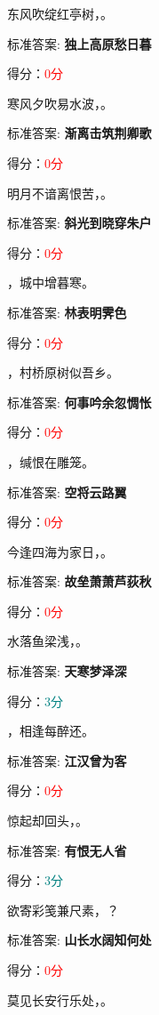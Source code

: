 \documentclass[12pt, a4paper, addpoints, answers]{exam}
\begin{document}
\begin{questions}
\question[3] 东风吹绽红亭树，\fillin 。

标准答案: \textbf{独上高原愁日暮}   

得分：\textcolor{red}{0分} 

\question[3] 寒风夕吹易水波，\fillin 。

标准答案: \textbf{渐离击筑荆卿歌}   

得分：\textcolor{red}{0分} 

\question[3] 明月不谙离恨苦，\fillin 。

标准答案: \textbf{斜光到晓穿朱户}   

得分：\textcolor{red}{0分} 

\question[3] \fillin ，城中增暮寒。

标准答案: \textbf{林表明霁色}   

得分：\textcolor{red}{0分} 

\question[3] \fillin ，村桥原树似吾乡。

标准答案: \textbf{何事吟余忽惆怅}   

得分：\textcolor{red}{0分} 

\question[3] \fillin ，缄恨在雕笼。

标准答案: \textbf{空将云路翼}   

得分：\textcolor{red}{0分} 

\question[3] 今逢四海为家日，\fillin 。

标准答案: \textbf{故垒萧萧芦荻秋}   

得分：\textcolor{red}{0分} 

\question[3] 水落鱼梁浅，\fillin[天寒梦泽深] 。

标准答案: \textbf{天寒梦泽深}   

得分：\textcolor{teal}{3分} 

\question[3] \fillin ，相逢每醉还。

标准答案: \textbf{江汉曾为客}   

得分：\textcolor{red}{0分} 

\question[3] 惊起却回头，\fillin[有恨无人省] 。

标准答案: \textbf{有恨无人省}   

得分：\textcolor{teal}{3分} 

\question[3] 欲寄彩笺兼尺素，\fillin ？

标准答案: \textbf{山长水阔知何处}   

得分：\textcolor{red}{0分} 

\question[3] 莫见长安行乐处，\fillin 。


\end{questions}
\end{document}
